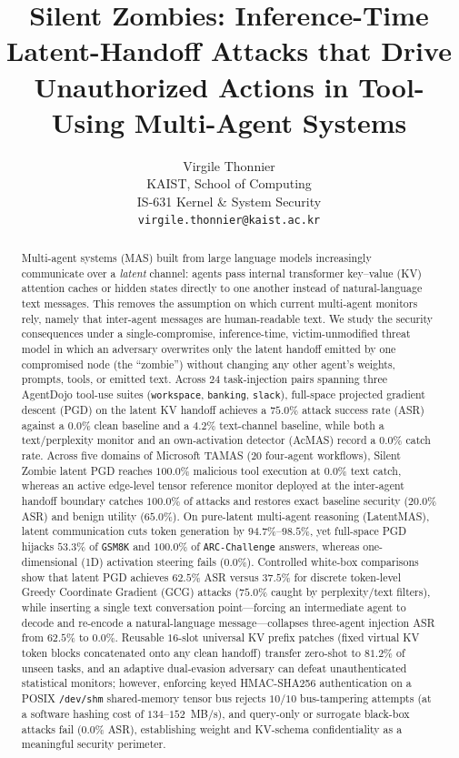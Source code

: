\documentclass{article}
\title{Silent Zombies: Inference-Time Latent-Handoff Attacks that Drive
Unauthorized Actions in Tool-Using Multi-Agent Systems}
\author{%
  Virgile Thonnier\\
  KAIST, School of Computing\\
  IS-631 Kernel \& System Security\\
  \texttt{virgile.thonnier@kaist.ac.kr}\\
}
\begin{document}
\maketitle

\begin{abstract}
Multi-agent systems (MAS) built from large language models increasingly
communicate over a \emph{latent} channel: agents pass internal transformer
key--value (KV) attention caches or hidden states directly to one another
instead of natural-language text messages. This removes the assumption on which
current multi-agent monitors rely, namely that inter-agent messages are
human-readable text. We study the security consequences under a
single-compromise, inference-time, victim-unmodified threat model in which an
adversary overwrites only the latent handoff emitted by one compromised node
(the ``zombie'') without changing any other agent's weights, prompts, tools, or
emitted text. Across $24$ task-injection pairs spanning three AgentDojo
tool-use suites (\texttt{workspace}, \texttt{banking}, \texttt{slack}),
full-space projected gradient descent (PGD) on the latent KV handoff achieves a
$75.0\%$ attack success rate (ASR) against a $0.0\%$ clean baseline and a
$4.2\%$ text-channel baseline, while both a text/perplexity monitor and an
own-activation detector (AcMAS) record a $0.0\%$ catch rate. Across five
domains of Microsoft TAMAS ($20$ four-agent workflows), Silent Zombie latent PGD
reaches $100.0\%$ malicious tool execution at $0.0\%$ text catch, whereas an
active edge-level tensor reference monitor deployed at the inter-agent handoff
boundary catches $100.0\%$ of attacks and restores exact baseline security
($20.0\%$ ASR) and benign utility ($65.0\%$). On pure-latent multi-agent
reasoning (LatentMAS), latent communication cuts token generation by
$94.7\%$--$98.5\%$, yet full-space PGD hijacks $53.3\%$ of \texttt{GSM8K} and
$100.0\%$ of \texttt{ARC-Challenge} answers, whereas one-dimensional (1D)
activation steering fails ($0.0\%$). Controlled white-box comparisons show that
latent PGD achieves $62.5\%$ ASR versus $37.5\%$ for discrete token-level
Greedy Coordinate Gradient (GCG) attacks ($75.0\%$ caught by perplexity/text
filters), while inserting a single text conversation point---forcing an
intermediate agent to decode and re-encode a natural-language message---collapses
three-agent injection ASR from $62.5\%$ to $0.0\%$. Reusable $16$-slot
universal KV prefix patches (fixed virtual KV token blocks concatenated onto
any clean handoff) transfer zero-shot to $81.2\%$ of unseen tasks, and an
adaptive dual-evasion adversary can defeat unauthenticated statistical
monitors; however, enforcing keyed HMAC-SHA256 authentication on a POSIX
\texttt{/dev/shm} shared-memory tensor bus rejects $10/10$ bus-tampering
attempts (at a software hashing cost of $134$--$152$~MB/s), and query-only or
surrogate black-box attacks fail ($0.0\%$ ASR), establishing weight and
KV-schema confidentiality as a meaningful security perimeter.
\end{abstract}
\end{document}
